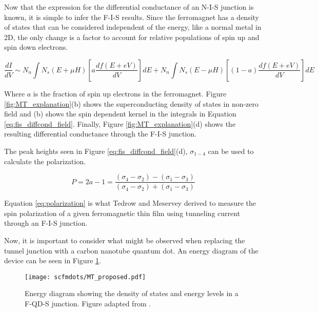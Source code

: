 Now that the expression for the differential conductance of an N-I-S junction is known, it is simple to infer the F-I-S results. Since the ferromagnet has a density of states that can be considered independent of the energy, like a normal metal in 2D, the only change is a factor to account for relative populations of spin up and spin down electrons.

\begin{equation}
    \label{eq:fis_diffcond_field}
    \frac{dI}{dV} \sim N_n \int N_s(E+\mu H)[a\frac{df(E+eV)}{dV}]dE + N_n \int N_s(E-\mu H)[(1-a)\frac{df(E+eV)}{dV}]dE
\end{equation}

Where $a$ is the fraction of spin up electrons in the ferromagnet. Figure \ref{fig:MT_explanation}(b) shows the superconducting density of states in non-zero field and (b) shows the spin dependent kernel in the integrals in Equation \ref{eq:fis_diffcond_field}. Finally, Figure \ref{fig:MT_explanation}(d) shows the resulting differential conductance through the F-I-S junction. 

The peak heights seen in Figure \ref{eq:fis_diffcond_field}(d), $\sigma_{1-4}$ can be used to calculate the polarization.

\begin{equation}
    \label{eq:polarization}
    P = 2a-1 = \frac{(\sigma_4 - \sigma_2) - (\sigma_1 - \sigma_3)}{(\sigma_4 - \sigma_2) + (\sigma_1 - \sigma_3)}
\end{equation}

Equation \ref{eq:polarization} is what Tedrow and Meservey derived to measure the spin polarization of a given ferromagnetic thin film using tunneling current through an F-I-S junction.

Now, it is important to consider what might be observed when replacing the tunnel junction with a carbon nanotube quantum dot. An energy diagram of the device can be seen in Figure \ref{fig:MT_proposed}.

\begin{figure}
    \centering
    \texttt{[image: scfmdots/MT\_proposed.pdf]}
    \caption{Energy diagram showing the density of states and energy levels in a F-QD-S junction. Figure adapted from \cite{Moodera2010}.}
    \label{fig:MT_proposed}
\end{figure}

